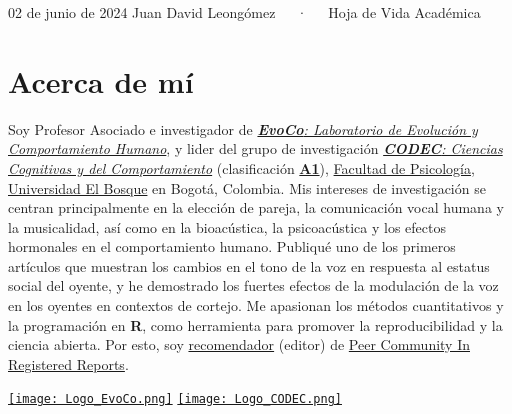\documentclass[11pt,a4paper,]{awesome-cv}
\begin{document}
\makecvheader

\makecvfooter
  {02 de junio de 2024}
    {Juan David Leongómez~~~·~~~Hoja de Vida Académica}
  {\thepage}





\section{Acerca de mí}\label{acerca-de-muxed}

\begin{minipage}[c]{0.85\linewidth}
Soy Profesor Asociado e investigador de \href{https://jdleongomez.info/es/team/}{\textit{\textbf{EvoCo}: Laboratorio de Evolución y Comportamiento Humano}}, y lider del grupo de investigación \href{https://investigaciones.unbosque.edu.co/codec}{\textit{\textbf{CODEC}: Ciencias Cognitivas y del Comportamiento}} (clasificación  \href{https://scienti.minciencias.gov.co/gruplac/jsp/visualiza/visualizagr.jsp?nro=00000000001446}{\textbf{A1}}),  \href{https://www.uelbosque.edu.co/psicologia}{Facultad de Psicología}, \href{https://www.uelbosque.edu.co/}{Universidad El Bosque} en Bogotá, Colombia. Mis intereses de investigación se centran principalmente en la elección de pareja, la comunicación vocal humana y la musicalidad, así como en la bioacústica, la psicoacústica y los efectos hormonales en el comportamiento humano. Publiqué uno de los primeros artículos que muestran los cambios en el tono de la voz en respuesta al estatus social del oyente, y he demostrado los fuertes efectos de la modulación de la voz en los oyentes en contextos de cortejo. Me apasionan los métodos cuantitativos y la programación en \textbf{R}, como herramienta para promover la reproducibilidad y la ciencia abierta. Por esto, soy \href{https://rr.peercommunityin.org/about/recommenders}{recomendador} (editor) de \href{https://rr.peercommunityin.org/}{Peer Community In Registered Reports}.
\end{minipage} \begin{minipage}[c]{0.15\linewidth}
\begin{flushright} 
\hfill \href{https://jdleongomez.info/es/team/}{\texttt{[image: Logo\_EvoCo.png]}} \newline \href{https://investigaciones.unbosque.edu.co/codec}{\texttt{[image: Logo\_CODEC.png]}}
\end{flushright}
\end{minipage}
\end{document}
